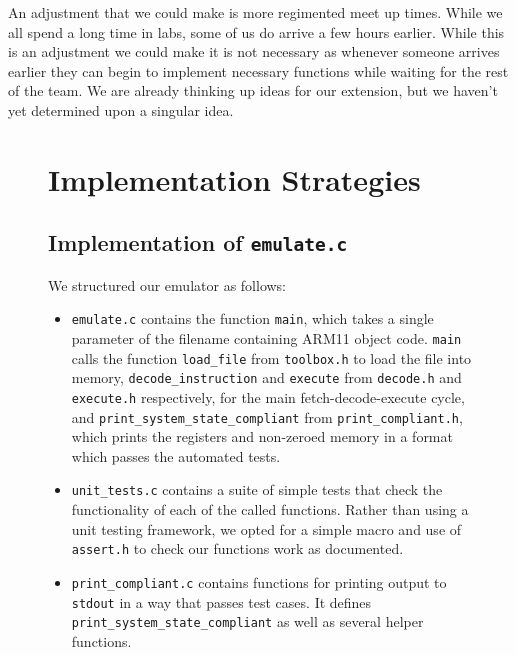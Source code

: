 \documentclass[10pt]{article}
\begin{document}
An adjustment that we could make is more regimented meet up times. While we all spend a long time in labs, some of us do arrive a few hours earlier. While this is an adjustment we could make it is not necessary as whenever someone arrives earlier they can begin to implement necessary functions while waiting for the rest of the team. We are already thinking up ideas for our extension, but we haven't yet determined upon a singular idea.

\begin{figure}[H]
\begin{minipage}{0.6\linewidth}

\section{Implementation Strategies}

\subsection{Implementation of \texttt{emulate.c}}

We structured our emulator as follows:

\begin{itemize}
\item \texttt{emulate.c} contains the function \texttt{main}, which takes a single parameter of the filename containing ARM11 object code. \texttt{main} calls the function \texttt{load\_file} from \texttt{toolbox.h} to load the file into memory, \texttt{decode\_instruction} and \texttt{execute} from \texttt{decode.h} and \texttt{execute.h} respectively, for the main fetch-decode-execute cycle, and \texttt{print\_system\_state\_compliant} from \texttt{print\_compliant.h}, which prints the registers and non-zeroed memory in a format which passes the automated tests.
\item \texttt{unit\_tests.c} contains a suite of simple tests that check the functionality of each of the called functions. Rather than using a unit testing framework, we opted for a simple macro and use of \texttt{assert.h} to check our functions work as documented.
\item \texttt{print\_compliant.c} contains functions for printing output to \texttt{stdout} in a way that passes test cases. It defines \texttt{print\_system\_state\_compliant} as well as several helper functions.
\end{itemize}

\end{minipage}
\hspace{0.05\linewidth}
\begin{minipage}{0.35\linewidth}


\end{minipage}
\end{figure}
\end{document}
